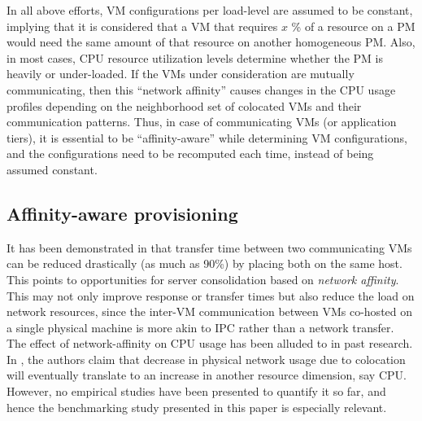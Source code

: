 In all above efforts, 
VM configurations per load-level are assumed 
to be constant, implying that 
it is considered that a VM that requires $x$ \% of a resource
on a PM would need the same amount of that resource on another
homogeneous PM. Also, in most cases, CPU resource utilization 
levels determine whether the PM is heavily or under-loaded.
If the VMs under consideration are
mutually communicating, then this ``network affinity'' causes changes
in the CPU usage profiles depending on the neighborhood set of
colocated VMs and their communication patterns. Thus, in case of 
communicating VMs (or application tiers), it is essential to be
``affinity-aware'' while determining VM configurations, and the configurations
need to be recomputed each time, instead of being assumed constant.

\subsection{Affinity-aware provisioning}
It has been demonstrated in \cite{virtual-putty} that
transfer time between two communicating VMs can be 
reduced drastically
(as much as 90\%) by placing both on the same host.
This points to opportunities for
server consolidation based on \textit{network affinity}. 
This may not only
improve response or transfer times but also reduce the load on network
resources, since the inter-VM communication between VMs co-hosted on a
single physical machine is more akin to IPC rather than a network transfer.
The effect of network-affinity on CPU usage has been 
alluded to in past research. In \cite{virtual-putty}, the authors
claim that decrease in physical network usage due to colocation will 
eventually translate to an increase in another resource dimension, say CPU.
However, no empirical studies have been presented to quantify it so far,
and hence the benchmarking study presented in this paper is especially relevant.


